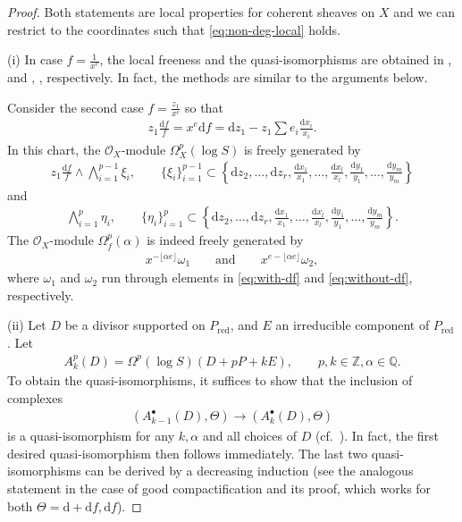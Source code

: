 \documentclass[pdftex]{sigma}
\newcommand{\QQ}{\mathbb{Q}}
\newcommand{\ZZ}{\mathbb{Z}}
\newcommand{\sO}{\mathscr{O}}
\newcommand{\de}{\mathrm{d}}
\newcommand{\ddRH}{\Theta}
\newcommand{\cpt}{compactification}
\newcommand{\flr}[1]{\lfloor #1 \rfloor}
\newcommand{\red}[1]{{#1}_{\mathrm{red}}}
\begin{document}
\begin{proof} Both statements are local properties for coherent sheaves on $X$ and we can restrict to the coordinates such that \eqref{eq:non-deg-local} holds.

(i) In case $f = \frac{1}{x^e}$, the local freeness and the quasi-isomorphisms are obtained in \cite[equation~(1.3.1)]{ESY}, \cite[Lemma 2.12(a)]{KKP} and \cite[Proposition~1.3.]{Y}, \cite[Proposition~1.4.2]{ESY},
respectively. In fact, the methods are similar to the arguments below.

Consider the second case $f = \frac{z_1}{x^e}$ so that
\begin{gather*} z_1\frac{\de f}{f} = x^e\de f = \de z_1 - z_1\sum e_i\frac{\de x_i}{x_i}. \end{gather*}
In this chart,
the $\sO_X$-module $\Omega_X^p(\log S)$ is freely generated by
\begin{gather}\label{eq:with-df}
z_1\frac{\de f}{f}\wedge\bigwedge_{i=1}^{p-1}\xi_i, \qquad \{\xi_i \}_{i=1}^{p-1} \subset \left\{ \de z_2,\dots, \de z_r,\frac{\de x_1}{x_1},\dots, \frac{\de x_l}{x_l},\frac{\de y_1}{y_1},\dots, \frac{\de y_m}{y_m} \right\}
\end{gather}
and
\begin{gather}\label{eq:without-df}
\bigwedge_{i=1}^p\eta_i, \qquad \{\eta_i \}_{i=1}^p \subset \left\{ \de z_2,\dots, \de z_r, \frac{\de x_1}{x_1},\dots, \frac{\de x_l}{x_l},\frac{\de y_1}{y_1},\dots, \frac{\de y_m}{y_m} \right\}.
\end{gather}
The $\sO_X$-module $\Omega_f^p(\alpha)$ is indeed freely generated by
\begin{gather}\label{eq:Kont-loc-gen}
x^{-\flr{\alpha e}}\omega_1 \qquad\text{and}\qquad x^{e-\flr{\alpha e}}\omega_2,
\end{gather}
where $\omega_1$ and $\omega_2$ run through elements in \eqref{eq:with-df} and \eqref{eq:without-df}, respectively.

(ii) Let $D$ be a divisor supported on $\red{P}$, and $E$ an irreducible component of $\red{P}$. Let
\begin{gather*} A^p_k(D) = \Omega^p(\log S)(D +pP + kE), \qquad p,k\in\ZZ, \alpha\in\QQ. \end{gather*}
To obtain the quasi-isomorphisms, it suffices to show that the inclusion of complexes
\begin{gather}\label{eq:extended}
(A_{k-1}^\bullet(D), \ddRH) \to (A_k^\bullet(D), \ddRH)
\end{gather}
is a quasi-isomorphism for any $k,\alpha$ and all choices of $D$ (cf.~\cite[Proposition~1.2]{Y}). In fact, the first desired quasi-isomorphism then follows immediately. The last two quasi-isomorphisms can be derived by a decreasing induction (see the analogous statement \cite[Proposition~1.4.2]{ESY} in the case of good {\cpt} and its proof, which works for both $\ddRH = \de+\de f, \de f$).


\end{proof}
\end{document}
